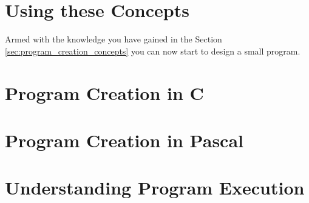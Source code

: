


\clearpage
\section{Using these Concepts} %
\label{sec:using_these_concepts_program_creation}

Armed with the knowledge you have gained in the Section \ref{sec:program_creation_concepts} you can now start to design a small program.





\clearpage
\def\pageLang{c}
\section{Program Creation in C}
\label{sec:program-creation-in-c}














\clearpage
\def\pageLang{pas}
\section{Program Creation in Pascal}
\label{sec:program-creation-in-pas}


\clearpage
\def\pageLang{none}
\section{Understanding Program Execution} %
\label{sec:understanding_program_execution}

